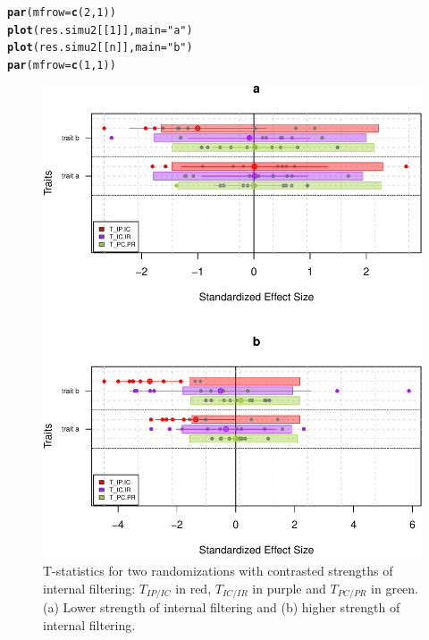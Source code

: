 \documentclass[12pt]{article}\usepackage[]{graphicx}\usepackage[]{color}
\makeatletter
\def\maxwidth{ %
  \ifdim\Gin@nat@width>\linewidth
    \linewidth
  \else
    \Gin@nat@width
  \fi
}
\newcommand{\hlnum}[1]{\textcolor[rgb]{0.686,0.059,0.569}{#1}}%
\newcommand{\hlstr}[1]{\textcolor[rgb]{0.192,0.494,0.8}{#1}}%
\newcommand{\hlstd}[1]{\textcolor[rgb]{0.345,0.345,0.345}{#1}}%
\newcommand{\hlkwc}[1]{\textcolor[rgb]{0.333,0.667,0.333}{#1}}%
\newcommand{\hlkwd}[1]{\textcolor[rgb]{0.737,0.353,0.396}{\textbf{#1}}}%
\newenvironment{kframe}{%
 \def\at@end@of@kframe{}%
 \ifinner\ifhmode%
  \def\at@end@of@kframe{\end{minipage}}%
  \begin{minipage}{\columnwidth}%
 \fi\fi%
 \def\FrameCommand##1{\hskip\@totalleftmargin \hskip-\fboxsep
 \colorbox{shadecolor}{##1}\hskip-\fboxsep
     \hskip-\linewidth \hskip-\@totalleftmargin \hskip\columnwidth}%
 \MakeFramed {\advance\hsize-\width
   \@totalleftmargin\z@ \linewidth\hsize
   \@setminipage}}%
 {\par\unskip\endMakeFramed%
 \at@end@of@kframe}
\newenvironment{knitrout}{}{} %
\makeatother
\begin{document}
\begin{knitrout}\small
{}\color{fgcolor}\begin{kframe}
\begin{alltt}
\hlkwd{par}\hlstd{(}\hlkwc{mfrow}\hlstd{=}\hlkwd{c}\hlstd{(}\hlnum{2}\hlstd{,} \hlnum{1}\hlstd{))}
\hlkwd{plot}\hlstd{(res.simu2[[}\hlnum{1}\hlstd{]],} \hlkwc{main}\hlstd{=}\hlstr{"a"}\hlstd{)}
\hlkwd{plot}\hlstd{(res.simu2[[n]],} \hlkwc{main}\hlstd{=}\hlstr{"b"}\hlstd{)}
\hlkwd{par}\hlstd{(}\hlkwc{mfrow}\hlstd{=}\hlkwd{c}\hlstd{(}\hlnum{1}\hlstd{,} \hlnum{1}\hlstd{))}
\end{alltt}
\end{kframe}\begin{figure}

{\centering \includegraphics[width=\maxwidth]{figure/typical_result_internal_filtering2-1} 

}

\caption[T-statistics for two randomizations with contrasted strengths of internal filtering]{T-statistics for two randomizations with contrasted strengths of internal filtering: $T_{IP/IC}$ in red, $T_{IC/IR}$ in purple and $T_{PC/PR}$ in green. (a) Lower strength of internal filtering and (b) higher strength of internal filtering.}\label{fig:typical_result_internal_filtering2}
\end{figure}


\end{knitrout}
\end{document}
